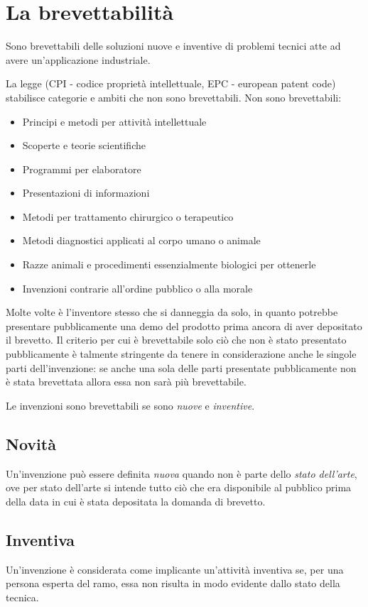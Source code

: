 \section{La brevettabilità}
Sono brevettabili delle soluzioni nuove e inventive di problemi tecnici atte ad avere un'applicazione industriale.\bigskip

La legge (CPI - codice proprietà intellettuale, EPC - european patent code) stabilisce categorie e ambiti che non sono brevettabili. Non sono brevettabili:
\begin{itemize}
    \item Principi e metodi per attività intellettuale
    \item Scoperte e teorie scientifiche
    \item Programmi per elaboratore
    \item Presentazioni di informazioni
    \item Metodi per trattamento chirurgico o terapeutico
    \item Metodi diagnostici applicati al corpo umano o animale
    \item Razze animali e procedimenti essenzialmente biologici per ottenerle
    \item Invenzioni contrarie all'ordine pubblico o alla morale
\end{itemize}

Molte volte è l'inventore stesso che si danneggia da solo, in quanto potrebbe presentare pubblicamente una demo del prodotto prima ancora di aver depositato il brevetto. 
Il criterio per cui è brevettabile solo ciò che non è stato presentato pubblicamente è talmente stringente da tenere in considerazione anche le singole parti dell'invenzione: se anche una sola delle parti presentate pubblicamente non è stata brevettata allora essa non sarà più brevettabile. \bigskip

Le invenzioni sono brevettabili se sono \textit{nuove} e \textit{inventive}.

\subsection{Novità}
Un'invenzione può essere definita \textit{nuova} quando non è parte dello \textit{stato dell'arte}, ove per stato dell'arte si intende tutto ciò che era disponibile al pubblico prima della data in cui è stata depositata la domanda di brevetto.

\subsection{Inventiva}
Un’invenzione è considerata come implicante un’attività inventiva se, per una persona esperta del ramo, essa non risulta in modo evidente dallo stato della tecnica. \bigskip

